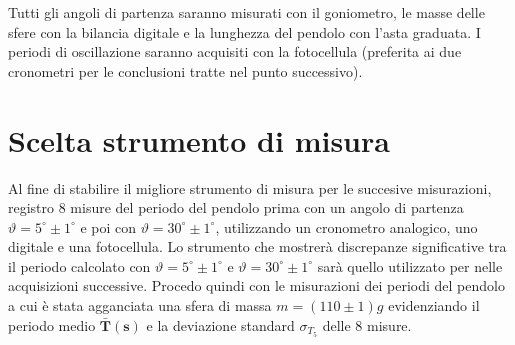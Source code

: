 \documentclass{article}
\begin{document}
	Tutti gli angoli di partenza saranno misurati con il goniometro, le masse delle sfere con la bilancia digitale e la lunghezza del pendolo con l'asta graduata. I periodi di oscillazione saranno acquisiti con la fotocellula (preferita ai due cronometri per le conclusioni tratte nel punto successivo).
	

	
	
	
	
	\newpage
	\section{Scelta strumento di misura}
	
	Al fine di stabilire il migliore strumento di misura per le succesive misurazioni, registro 8 misure del periodo del pendolo prima con un angolo di partenza $\vartheta = 5^\circ \pm1^\circ$ e poi con $\vartheta = 30^\circ\pm1^\circ$, utilizzando un cronometro analogico, uno digitale e una fotocellula. Lo strumento che mostrerà discrepanze significative tra il periodo calcolato con $\vartheta = 5^\circ\pm1^\circ$ e $\vartheta = 30^\circ\pm1^\circ$ sarà quello utilizzato per nelle acquisizioni successive. Procedo quindi con le misurazioni dei periodi del pendolo a cui è stata agganciata una sfera di massa $m = (110 \pm 1)g$ evidenziando il periodo medio $\mathbf{\bar{T}(s)}$ e la deviazione standard $\sigma_{T_{5}}$ delle 8 misure. 
	
\end{document}
